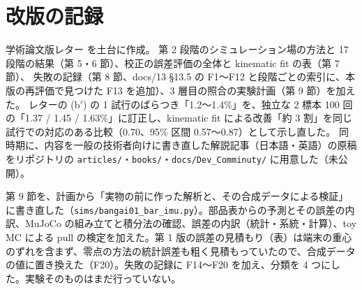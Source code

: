 \documentclass[paper=a4paper,fontsize=10pt,twocolumn,column_gap=2zw,line_length=24zw,number_of_lines=46,head_space=20mm]{jlreq}
\begin{document}
\section{改版の記録}
\small
\begin{description}\setlength{\itemsep}{0pt}
\item[第 1 版（2026-11-26）] 学術論文版レター \cite{letter2026} を土台に作成。
第 2 段階のシミュレーション場の方法と 17 段階の結果（第 5・6 節）、校正の誤差評価の全体と kinematic fit の表（第 7 節）、
失敗の記録（第 8 節、docs/13 §13.5 の F1〜F12 と段階ごとの索引に、本版の再評価で見つけた F13 を追加）、3 層目の照合の実験計画（第 9 節）を加えた。
レターの (b$'$) の 1 試行のばらつき「1.2〜1.4\%」を、独立な 2 標本 100 回の「1.37 / 1.45 / 1.63\%」に訂正し、kinematic fit による改善「約 3 割」を同じ試行での対応のある比較（0.70、95\% 区間 0.57〜0.87）として示し直した。
同時期に、内容を一般の技術者向けに書き直した解説記事（日本語・英語）の原稿をリポジトリの \texttt{articles/}・\texttt{books/}・\texttt{docs/Dev\_Comminuty/} に用意した（未公開）。
\item[第 2 版（2026-11-26）] 第 9 節を、計画から「実物の前に作った解析と、その合成データによる検証」に書き直した（\texttt{sims/bangai01\_bar\_imu.py}）。部品表からの予測とその誤差の内訳、MuJoCo の組み立てと積分法の確認、誤差の内訳（統計・系統・計算）、toy MC による pull の検定を加えた。第 1 版の誤差の見積もり（表）は端末の重心のずれを含まず、零点の方法の統計誤差も粗く見積もっていたので、合成データの値に置き換えた（F20）。失敗の記録に F14〜F20 を加え、分類を 4 つにした。実験そのものはまだ行っていない。
\end{description}
\end{document}
